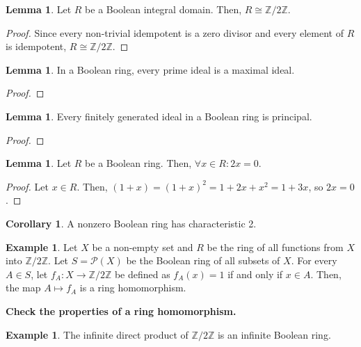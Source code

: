 \documentclass{article}
\theoremstyle{definition}
\newtheorem{lemma}[theorem]{Lemma}
\newtheorem{corollary}{Corollary}[theorem]
\newtheorem{example}[theorem]{Example}
\newcommand{\Z}{\mathbb{Z}}
\begin{document}
\begin{lemma}
    Let $R$ be a Boolean integral domain. Then, $R \cong \Z / 2\Z$.
\end{lemma}
\begin{proof}
    Since every non-trivial idempotent is a zero divisor and every element of $R$ is idempotent,
    $R \cong \Z / 2\Z$.
\end{proof}

\begin{lemma}
    In a Boolean ring, every prime ideal is a maximal ideal.
\end{lemma}
\begin{proof}
    
\end{proof}

\begin{lemma}
    Every finitely generated ideal in a Boolean ring is principal.
\end{lemma}
\begin{proof}
    
\end{proof}

\begin{lemma}\label{x_plus_x_is_0_in_boolean_rings}
    Let $R$ be a Boolean ring. Then, $\forall x \in R: 2x = 0$.
\end{lemma}
\begin{proof}
    Let $x \in R$. Then, $(1+x) = (1+x)^{2} = 1 + 2x + x^{2} = 1 + 3x$,
    so $2x = 0$.
\end{proof}

\begin{corollary}
    A nonzero Boolean ring has characteristic 2.
\end{corollary}

\begin{example}
    Let $X$ be a non-empty set and $R$ be the ring of all functions from $X$ into $\Z / 2\Z$.
    Let $S = \mathcal{P}(X)$ be the Boolean ring of all subsets of $X$.
    For every $A \in S$, let $f_{A}: X \xrightarrow{} \Z / 2\Z$ be defined as $f_{A}(x) = 1$ 
    if and only if $x \in A$. Then, the map $A \mapsto f_{A}$ is a ring homomorphism.

    \textbf{Check the properties of a ring homomorphism.}
\end{example}


\begin{example}
    The infinite direct product of $\Z / 2\Z$ is an infinite Boolean ring.
\end{example}
\end{document}
